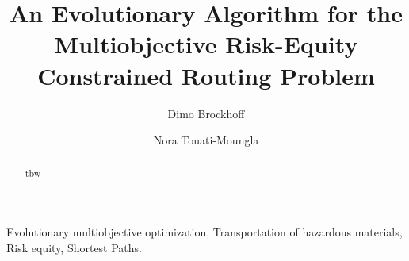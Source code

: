\documentclass[preprint,12pt]{elsarticle}
\begin{document}
\begin{frontmatter}



\title{An Evolutionary Algorithm for the Multiobjective Risk-Equity Constrained Routing Problem}


\author{Dimo Brockhoff}
\address{INRIA Lille - Nord Europe, DOLPHIN team, 59650 Villeneuve d'Ascq, France\\
{\upshape \url{dimo.brockhoff@inria.fr}}}

\author{Nora Touati-Moungla}
\address{Laboratoire d'Informatique, \'{E}cole Polytechnique, 91128 Palaiseau Cedex, France\\
{\upshape \url{touati@lix.polytechnique.fr}}}



\begin{abstract}
tbw
\end{abstract}

\begin{keyword}
Evolutionary multiobjective optimization, Transportation of hazardous materials, Risk equity, Shortest Paths. 
\end{keyword}

\end{frontmatter}


\end{document}
